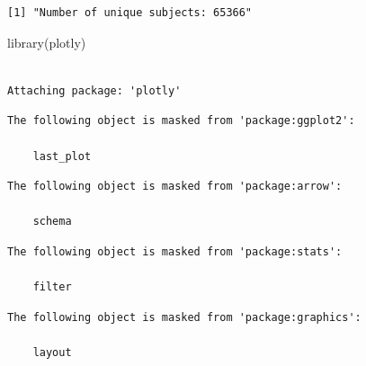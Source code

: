 \documentclass[
]{article}
\newenvironment{Shaded}{\begin{snugshade}}{\end{snugshade}}
\newcommand{\FunctionTok}[1]{\textcolor[rgb]{0.00,0.00,0.00}{#1}}
\newcommand{\NormalTok}[1]{\textcolor[rgb]{0.00,0.00,0.00}{#1}}
\begin{document}
\begin{verbatim}
[1] "Number of unique subjects: 65366"
\end{verbatim}

\begin{Shaded}
\begin{Highlighting}[]
\FunctionTok{library}\NormalTok{(plotly)}
\end{Highlighting}
\end{Shaded}

\begin{verbatim}

Attaching package: 'plotly'
\end{verbatim}

\begin{verbatim}
The following object is masked from 'package:ggplot2':

    last_plot
\end{verbatim}

\begin{verbatim}
The following object is masked from 'package:arrow':

    schema
\end{verbatim}

\begin{verbatim}
The following object is masked from 'package:stats':

    filter
\end{verbatim}

\begin{verbatim}
The following object is masked from 'package:graphics':

    layout
\end{verbatim}
\end{document}
